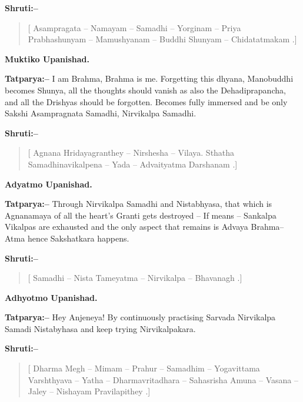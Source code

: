 \textbf{Shruti:–}

\begin{verse}
[ Asampragata – Namayam – Samadhi – Yorginam – Priya  Prabhashunyam – Mamushyanam – Buddhi Shunyam – Chidatatmakam .]
\end{verse}

\begin{flushright}
\textbf{Muktiko Upanishad.}
\end{flushright}

\textbf{Tatparya:–} I am Brahma, Brahma is me. Forgetting this dhyana, Manobuddhi becomes Shunya, all the thoughts should vanish as also the Dehadiprapancha, and all the Drishyas should be forgotten. Becomes fully immersed and be only Sakshi Asampragnata Samadhi, Nirvikalpa Samadhi.

\textbf{Shruti:–}

\begin{verse}
[ Agnana Hridayagranthey – Nirshesha – Vilaya. Sthatha  Samadhinavikalpena – Yada – Advaityatma Darshanam .]
\end{verse}

\begin{flushright}
\textbf{Adyatmo Upanishad.}
\end{flushright}

\textbf{Tatparya:–} Through Nirvikalpa Samadhi and Nistabhyasa, that which is Agnanamaya of all the heart's Granti gets destroyed – If means – Sankalpa Vikalpas are exhausted and the only aspect that remains is Advaya Brahma–Atma hence Sakshatkara happens.

\textbf{Shruti:–}

\begin{verse}
[ Samadhi – Nista Tameyatma – Nirvikalpa – Bhavanagh .]
\end{verse}

\begin{flushright}
\textbf{Adhyotmo Upanishad.}
\end{flushright}

\textbf{Tatparya:–} Hey Anjeneya! By continuously practising Sarvada Nirvikalpa Samadi Nistabyhasa and keep trying Nirvikalpakara.

\textbf{Shruti:–}

\begin{verse}
[ Dharma Megh – Mimam – Prahur – Samadhim – Yogavittama  Varshthyava – Yatha – Dharmavritadhara – Sahasrisha  Amuna – Vasana – Jaley – Nishayam Pravilapithey .]
\end{verse}


